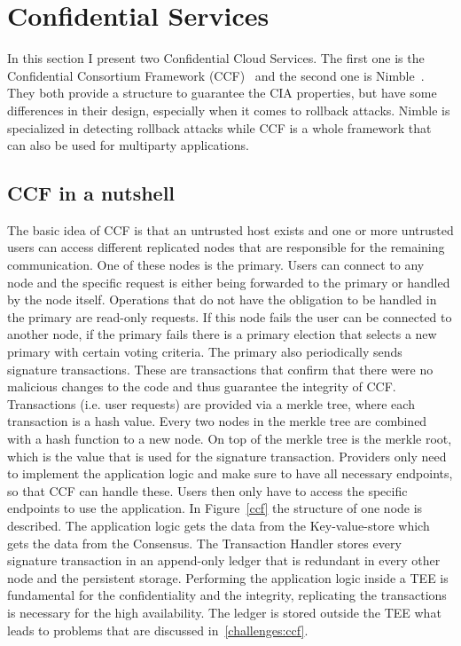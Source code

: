 \section{Confidential Services}
In this section I present two Confidential Cloud Services. The first one is the Confidential Consortium Framework (CCF)~\cite{Howard} and the second one is Nimble~\cite{Nimble}. They both provide a structure to guarantee the CIA properties, but have some differences in their design, especially when it comes to rollback attacks. Nimble is specialized in detecting rollback attacks while CCF is a whole framework that can also be used for multiparty applications.
\subsection{CCF in a nutshell}
The basic idea of CCF is that an untrusted host exists and one or more untrusted users can access different replicated nodes that are responsible for the remaining communication. One of these nodes is the primary. Users can connect to any node and the specific request is either being forwarded to the primary or handled by the node itself. Operations that do not have the obligation to be handled in the primary are read-only requests. If this node fails the user can be connected to another node, if the primary fails there is a primary election that selects a new primary with certain voting criteria. The primary also periodically sends signature transactions. These are transactions that confirm that there were no malicious changes to the code and thus guarantee the integrity of CCF. Transactions (i.e. user requests) are provided via a merkle tree, where each transaction is a hash value. Every two nodes in the merkle tree are combined with a hash function to a new node. On top of the merkle tree is the merkle root, which is the value that is used for the signature transaction. %
 Providers only need to implement the application logic and make sure to have all necessary endpoints, so that CCF can handle these. Users then only have to access the specific endpoints to use the application.  In Figure~\ref{ccf} the structure of one node is described. The application logic gets the data from the Key-value-store which gets the data from the Consensus. %
  The Transaction Handler stores every signature transaction in an append-only ledger that is redundant in every other node and the persistent storage. Performing the application logic inside a TEE is fundamental for the confidentiality and the integrity, replicating the transactions is necessary for the high availability. The ledger is stored outside the TEE what leads to problems that are discussed in~\ref{challenges:ccf}.
